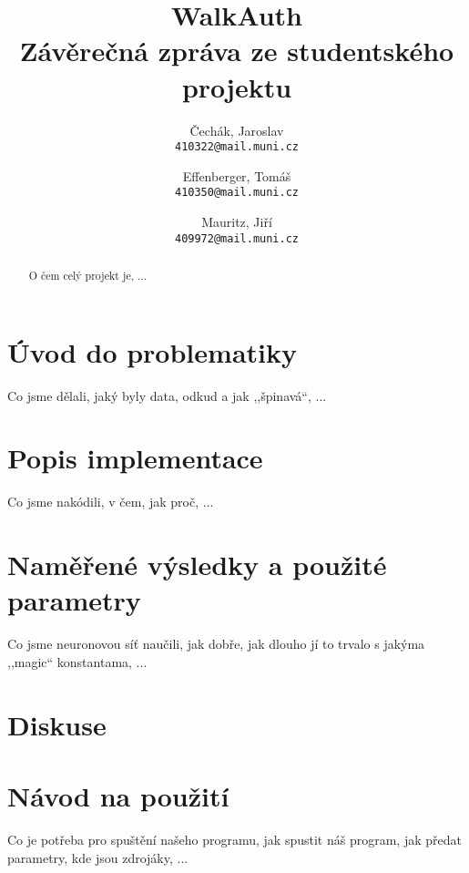 \documentclass[a4paper, 10pt, twocolumn]{article}
\title{WalkAuth\\
\large Závěrečná zpráva ze studentského projektu
}
\author{Čechák, Jaroslav\\
	\texttt{410322@mail.muni.cz}
	\and
	Effenberger, Tomáš\\
	\texttt{410350@mail.muni.cz}
	\and
	Mauritz, Jiří\\
	\texttt{409972@mail.muni.cz}
}
\date{}
\begin{document}
\twocolumn[\maketitle]

\begin{abstract}
O čem celý projekt je, ...
\end{abstract}

\section{Úvod do problematiky}
Co jsme dělali, jaký byly data, odkud a jak ,,špinavá``, ...

\section{Popis implementace}
Co jsme nakódili, v čem, jak proč, ...

\section{Naměřené výsledky a použité parametry}
Co jsme neuronovou síť naučili, jak dobře, jak dlouho jí to trvalo s jakýma ,,magic`` konstantama, ...

\section{Diskuse}

\appendix
\section{Návod na použití}
Co je potřeba pro spuštění našeho programu, jak spustit náš program, jak předat parametry, kde jsou zdrojáky, ...
\end{document}
